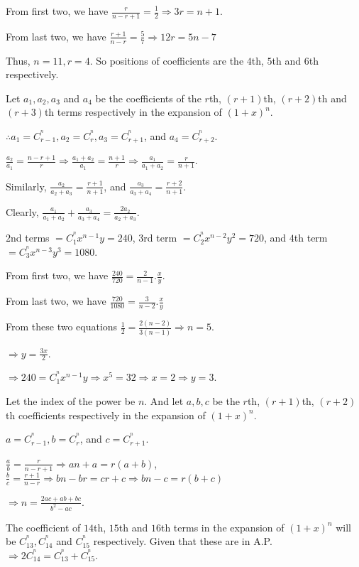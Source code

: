   From first two, we have $\frac{r}{n - r + 1}= \frac{1}{2} \Rightarrow 3r = n + 1$.

  From last two, we have $\frac{r + 1}{n - r} = \frac{5}{7}\Rightarrow 12r = 5n - 7$

  Thus, $n = 11, r = 4$. So positions of coefficients are the $4$th, $5$th and $6$th respectively.
\item Let $a_1, a_2, a_3$ and $a_4$ be the coefficients of the $r$th, $(r + 1)$th, $(r + 2)$th and $(r +
  3)$th terms respectively in the expansion of $(1 + x)^n$.

  $\therefore a_1 = C_{r - 1}^^n, a_2 = C_r^^n, a_3 = C_{r + 1}^^n$, and $a_4 = C_{r + 2}^^n$.

  $\frac{a_2}{a_1} = \frac{n - r + 1}{r}\Rightarrow \frac{a_1 + a_2}{a_1} = \frac{n + 1}{r}\Rightarrow
  \frac{a_1}{a_1 + a_2} = \frac{r}{n + 1}$.

  Similarly, $\frac{a_2}{a_2 + a_3} = \frac{r + 1}{n + 1}$, and $\frac{a_3}{a_3 + a_4} = \frac{r + 2}{n +
    1}$.

  Clearly, $\frac{a_1}{a_1 + a_2} + \frac{a_3}{a_3 + a_4} = \frac{2a_2}{a_2 + a_3}$.
\item $2$nd terms $= C_1^^nx^{n - 1}y = 240$, $3$rd term $= C_2^^nx^{n - 2}y^2 = 720$, and $4$th term $=
  C_3^^nx^{n - 3}y^3 = 1080$.

  From first two, we have $\frac{240}{720} = \frac{2}{n - 1}.\frac{x}{y}$.

  From last two, we have $\frac{720}{1080} = \frac{3}{n - 2}.\frac{x}{y}$

  From these two equations $\frac{1}{2} = \frac{2(n - 2)}{3(n - 1)}\Rightarrow n = 5$.

  $\Rightarrow y = \frac{3x}{2}$.

  $\Rightarrow 240 = C_1^^nx^{n - 1}y \Rightarrow x^5 = 32 \Rightarrow x = 2 \Rightarrow y = 3$.
\item Let the index of the power be $n$. And let $a, b, c$ be the $r$th, $(r + 1)$th, $(r + 2)$th
  coefficients respectively in the expansion of $(1 + x)^n$.

  $a = C_{r - 1}^^n, b = C_r^^n$, and $c = C_{r + 1}^^n$.

  $\frac{a}{b} = \frac{r}{n - r + 1} \Rightarrow an + a = r(a + b)$, $\frac{b}{c} = \frac{r + 1}{n - r}
  \Rightarrow bn - br = cr + c \Rightarrow bn - c = r(b + c)$

  $\Rightarrow n = \frac{2ac + ab + bc}{b^2 - ac}$.
\item The coefficient of $14$th, $15$th and $16$th terms in the expansion of $(1 + x)^n$ will be $C_{13}^^n,
  C_{14}^^n$ and $C_{15}^^n$ respectively. Given that these are in A.P. $\Rightarrow 2C_{14}^^n = C_{13}^^n
  + C_{15}^^n$.

